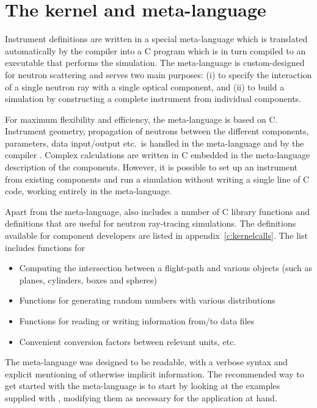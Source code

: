 
\chapter{The \MCS kernel and meta-language}
\label{c:kernel}

Instrument definitions are written in a special \MCS meta-language which
is translated automatically by the compiler \mcs into a C program
which is in turn compiled to an executable that
performs the simulation. The meta-language is custom-designed for neutron
scattering and serves two main purposes: (i) to specify the interaction of a
single neutron ray with a single optical component, and (ii) to build a
simulation by constructing a complete instrument from individual
components.

For maximum flexibility and efficiency, the meta-language is based on C.
Instrument geometry, propagation of neutrons between the different
components, parameters, data input/output etc.\ is handled in the
meta-language and by the compiler \mcs. Complex calculations are written in
C embedded in the meta-language description of the
components. However, it is
possible to set up an instrument from existing components and
run a simulation without writing a single line of C code, working
entirely in the meta-language.

Apart from the meta-language, \MCS also includes a number of C library
functions and definitions that are useful for neutron ray-tracing
simulations. The definitions available for component developers are
listed in appendix~\ref{c:kernelcalls}. The list includes functions
for
\begin{itemize}
\item Computing the intersection between a flight-path and various
  objects (such as planes, cylinders, boxes and spheres)
\item Functions for generating random numbers
with various distributions
\item Functions for reading or writing information from/to data
  files
\item Convenient conversion factors between relevant units, etc.
\end{itemize}

The \MCS meta-language was designed to be readable, with a verbose
syntax and explicit mentioning of otherwise implicit information. The
recommended way to get started with the meta-language is to start by
looking at the examples supplied with \MCS, modifying them as necessary
for the application at hand.

